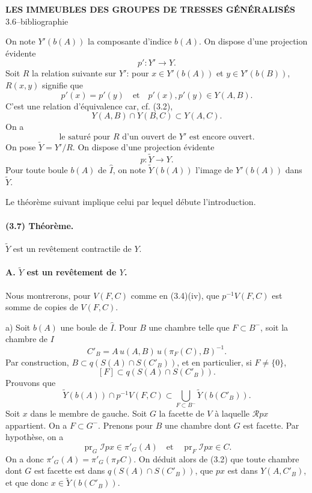 \documentclass[10pt]{article}
\begin{document}
\begin{center}
{\Large\bfseries LES IMMEUBLES DES GROUPES DE TRESSES GÉNÉRALISÉS}\\[0.4em]
{\normalsize 3.6--bibliographie}
\end{center}


On note \(Y'(b(A))\) la composante d'indice \(b(A)\). On dispose d'une projection évidente
\[
p':Y'\longrightarrow Y.
\]
Soit \(R\) la relation suivante sur \(Y'\): pour \(x\in Y'(b(A))\) et \(y\in Y'(b(B))\), \(R(x,y)\) signifie que
\[
p'(x)=p'(y)\quad\text{et}\quad p'(x),p'(y)\in Y(A,B).
\]
C'est une relation d'équivalence car, cf. (3.2),
\[
Y(A,B)\cap Y(B,C)\subset Y(A,C).
\]
On a
\[
\tag{3.6.1}
\text{le saturé pour }R\text{ d'un ouvert de }Y'\text{ est encore ouvert.}
\]
On pose \(\widetilde Y=Y'/R\). On dispose d'une projection évidente
\[
p:\widetilde Y\longrightarrow Y.
\]
Pour toute boule \(b(A)\) de \(\widehat I\), on note \(\widetilde Y(b(A))\) l'image de \(Y'(b(A))\) dans \(\widetilde Y\).

Le théorème suivant implique celui par lequel débute l'introduction.

\paragraph{(3.7) Théorème.} \(\widetilde Y\) est un revêtement contractile de \(Y\).

\paragraph{A. \(\widetilde Y\) est un revêtement de \(Y\).} Nous montrerons, pour \(V(F,C)\) comme en (3.4)(iv), que \(p^{-1}V(F,C)\) est somme de copies de \(V(F,C)\).

a) Soit \(b(A)\) une boule de \(\widehat I\). Pour \(B\) une chambre telle que \(F\subset B^{-}\), soit la chambre de \(I\)
\[
C'_B=A\,u(A,B)\,u(\pi_F(C),B)^{-1}.
\]
Par construction, \(B\subset q(S(A)\cap S(C'_B))\), et en particulier, si \(F\ne\{0\}\),
\[
\tag{3.7.1}
[F]\subset q(S(A)\cap S(C'_B)).
\]
Prouvons que
\[
\tag{3.7.2}
\widetilde Y(b(A))\cap p^{-1}V(F,C)
\subset
\bigcup_{F\subset B^-}\widetilde Y(b(C'_B)).
\]
Soit \(x\) dans le membre de gauche. Soit \(G\) la facette de \(V\) à laquelle \(\mathcal Rpx\) appartient. On a \(F\subset G^{-}\). Prenons pour \(B\) une chambre dont \(G\) est facette. Par hypothèse, on a
\[
\operatorname{pr}_G\mathcal Ipx\in\pi'_G(A)
\quad\text{et}\quad
\operatorname{pr}_F\mathcal Ipx\in C.
\]
On a donc \(\pi'_G(A)=\pi'_G(\pi_FC)\). On déduit alors de (3.2) que toute chambre dont \(G\) est facette est dans \(q(S(A)\cap S(C'_B))\), que \(px\) est dans \(Y(A,C'_B)\), et que donc \(x\in \widetilde Y(b(C'_B))\).
\end{document}
